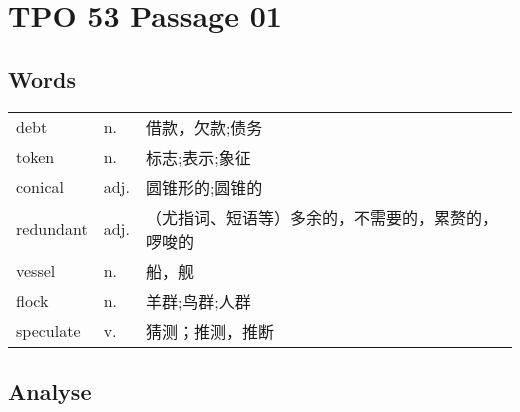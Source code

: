 \section{TPO 53 Passage 01}

\subsection{Words}

\begin{tabular}{lll}
    debt      & n.   & 借款，欠款;债务                  \\
    token     & n.   & 标志;表示;象征                  \\
    conical   & adj. & 圆锥形的;圆锥的                  \\
    redundant & adj. & （尤指词、短语等）多余的，不需要的，累赘的，啰唆的 \\
    vessel    & n.   & 船，舰                       \\
    flock     & n.   & 羊群;鸟群;人群                  \\
    speculate & v.   & 猜测；推测，推断                  \\
\end{tabular}

\subsection{Analyse}

